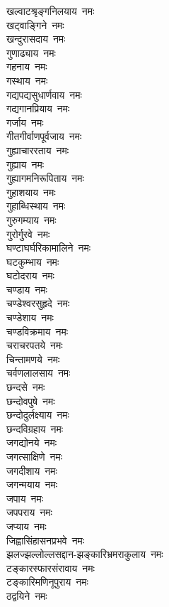 \begin{multicols}{2}
\begin{flushleft}
खल्वाटश्रृङ्गनिलयाय~नमः\\
खट्वाङ्गिने~नमः\\
खन्दुरासदाय~नमः\\
गुणाढ्याय~नमः\\
गहनाय~नमः\\
गस्थाय~नमः\\
गद्यपद्यसुधार्णवाय~नमः\hfill{}\\
गद्यगानप्रियाय~नमः\\
गर्जाय~नमः\\
गीतगीर्वाणपूर्वजाय~नमः\\
गुह्याचाररताय~नमः\\
गुह्याय~नमः\\
गुह्यागमनिरूपिताय~नमः\\
गुहाशयाय~नमः\\
गुहाब्धिस्थाय~नमः\\
गुरुगम्याय~नमः\\
गुरोर्गुरवे~नमः\hfill{}\\
घण्टाघर्घरिकामालिने~नमः\\
घटकुम्भाय~नमः\\
घटोदराय~नमः\\
चण्डाय~नमः\\
चण्डेश्वरसुहृदे~नमः\\
चण्डेशाय~नमः\\
चण्डविक्रमाय~नमः\\
चराचरपतये~नमः\\
चिन्तामणये~नमः\\
चर्वणलालसाय~नमः\hfill{}\\
छन्दसे~नमः\\
छन्दोवपुषे~नमः\\
छन्दोदुर्लक्ष्याय~नमः\\
छन्दविग्रहाय~नमः\\
जगद्योनये~नमः\\
जगत्साक्षिणे~नमः\\
जगदीशाय~नमः\\
जगन्मयाय~नमः\\
जपाय~नमः\\
जपपराय~नमः\hfill{}\\
जप्याय~नमः\\
जिह्वासिंहासनप्रभवे~नमः\\
झलज्झल्लोल्लसद्दान-झङ्कारिभ्रमराकुलाय~नमः\\
टङ्कारस्फारसंरावाय~नमः\\
टङ्कारिमणिनूपुराय~नमः\\
ठद्वयिने~नमः\\

\end{flushleft}
\end{multicols}
